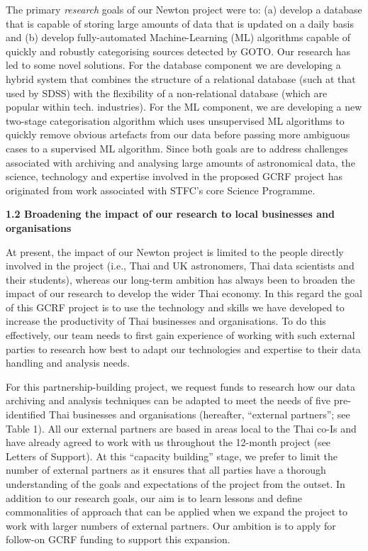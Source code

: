 \documentclass[11pt]{article}
\begin{document}
  \vspace{2mm}
  \noindent
  The primary {\it research} goals of our Newton project were to: (a) develop a database that is capable of storing large amounts of data that is updated on a daily basis and (b) develop fully-automated Machine-Learning (ML) algorithms capable of quickly and robustly categorising sources detected by GOTO. Our research has led to some novel solutions. For the database component we are developing a hybrid system that combines the structure of a relational database (such at that used by SDSS) with the flexibility of a non-relational database (which are popular within tech. industries). For the ML component, we are developing a new two-stage categorisation algorithm which uses unsupervised ML algorithms to quickly remove obvious artefacts from our data before passing more ambiguous cases to a supervised ML algorithm. Since both goals are to address challenges associated with archiving and analysing large amounts of astronomical data, the science, technology and expertise involved in the proposed GCRF project has originated from work associated with STFC's core Science Programme. 
  
  \vspace{3mm}
  \noindent
  {\large \bf 1.2 Broadening the impact of our research to local businesses and organisations}
  
  \noindent
  At present, the impact of our Newton project is limited to the people directly involved in the project (i.e., Thai and UK astronomers, Thai data scientists and their students), whereas our long-term ambition has always been to broaden the impact of our research to develop the wider Thai economy. In this regard the goal of this GCRF project is to use the technology and skills we have developed to increase the productivity of Thai businesses and organisations. To do this effectively, our team needs to first gain experience of working with such external parties to research how best to adapt our technologies and expertise to their data handling and analysis needs.  
  
  \vspace{2mm}
  \noindent
  For this partnership-building project, we request funds to research how our data archiving and analysis techniques can be adapted to meet the needs of five pre-identified Thai businesses and organisations (hereafter, ``external partners''; see Table 1). All our external partners are based in areas local to the Thai co-Is and have already agreed to work with us throughout the 12-month project (see Letters of Support). At this ``capacity building'' stage, we prefer to limit the number of external partners as it ensures that all parties have a thorough understanding of the goals and expectations of the project from the outset. In addition to our research goals, our aim is to learn lessons and define commonalities of approach that can be applied when we expand the project to work with larger numbers of external partners. Our ambition is to apply for follow-on GCRF funding to support this expansion.
  
\end{document}

